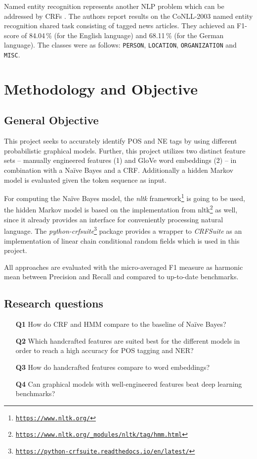 \documentclass[twocolumns]{IEEEtran}
\begin{document}
Named entity recognition represents another NLP problem which can be addressed by CRFs \cite{McCallum2003}. The authors report results on the CoNLL-2003 named entity recognition shared task consisting of tagged news articles. They achieved an F1-score of 84.04\,\% (for the English language) and 68.11\,\% (for the German language). The classes were as follows: \texttt{PERSON}, \texttt{LOCATION}, \texttt{ORGANIZATION} and \texttt{MISC}.

\section{Methodology and Objective}
\subsection{General Objective}
This project seeks to accurately identify POS and NE tags by using different probabilistic graphical models. 
Further, this project utilizes two distinct feature sets -- manually engineered features (1) and GloVe word embeddings (2) \cite{pennington} -- in combination with a Na\"ive Bayes and a CRF. 
Additionally a hidden Markov model is evaluated given the token sequence as input.

For computing the Na\"ive Bayes model, the \textit{nltk} framework\footnote{\texttt{\url{https://www.nltk.org/}}} is going to be used, the hidden Markov model is based on the implementation from nltk\footnote{\texttt{\url{https://www.nltk.org/_modules/nltk/tag/hmm.html}}} as well, since it already provides an interface for conveniently processing natural language. The \textit{python-crfsuite}\footnote{\texttt{\url{https://python-crfsuite.readthedocs.io/en/latest/}}} package provides a wrapper to \textit{CRFSuite} as an implementation of linear chain conditional random fields which is used in this project.

All approaches are evaluated with the micro-averaged F1 measure as harmonic mean between Precision and Recall and compared to up-to-date benchmarks.


\subsection{Research questions}
\begin{enumerate}
\item[\textbf{Q1}] How do CRF and HMM compare to the baseline of Na\"ive Bayes? 
\item[\textbf{Q2}] Which handcrafted features are suited best for the different models in order to reach a high accuracy for POS tagging and NER?
\item[\textbf{Q3}] How do handcrafted features compare to word embeddings?
\item[\textbf{Q4}] Can graphical models with well-engineered features beat deep learning benchmarks?
\end{enumerate}
\end{document}
